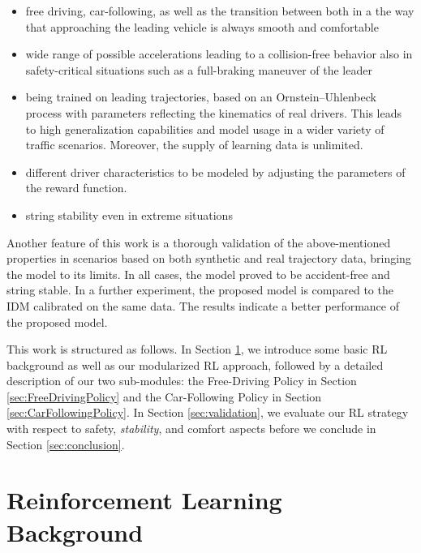 \documentclass[review]{elsarticle}
\providecommand{\martinc}[1]{}                  %
\providecommand{\3}{{\ss}}
\begin{document}
	
	\begin{itemize}
		\item free driving,
		car-following, as well as the transition between both in a
		the way that approaching the leading vehicle is always smooth and comfortable
		\item wide range of possible
		accelerations leading to a collision-free behavior
		also in safety-critical situations such as a full-braking maneuver of the leader
		\item being trained on leading trajectories,
		based on an Ornstein–Uhlenbeck process \citep{OU}
		with parameters reflecting the kinematics of real
		drivers. This leads to high generalization capabilities and
		model usage in a wider variety of traffic
		scenarios. Moreover, the supply of learning data is
		unlimited.
		\item different driver characteristics to be modeled by adjusting the parameters of the reward function.
		\item string stability even in extreme situations	
	\end{itemize}
	
	Another feature of this work is a thorough validation of the above-mentioned properties in scenarios based on both synthetic and real trajectory data, bringing the model to its limits. 
	In all cases, the model proved to be accident-free and string stable.
	In a further experiment, the proposed model is compared to the IDM calibrated on the same data. The results indicate a better performance of the proposed model.
	\martinc{Nach vorgestelltem Nebensatz oder Phrase (In Section ...,) folgt vor dem
		Hauptsatz (``we introduce...'') immer ein Komma}
	This work is structured as follows. In Section \ref{sec:RLBackground},
	we introduce some basic RL background as well as our modularized RL
	approach, followed by a detailed description of our two sub-modules:
	the Free-Driving Policy in Section \ref{sec:FreeDrivingPolicy} and the
	Car-Following Policy in Section
	\ref{sec:CarFollowingPolicy}. \martinc{In Englisch wird nach
		Doppelpunkt klein weitergeschrieben, wenn kein vollst\"andiger Satz
		folgt wie hier} In Section \ref{sec:validation}, we evaluate our RL
	strategy with respect to safety, \emph{stability}, and comfort aspects
	before we conclude in Section \ref{sec:conclusion}.
	
	
	\section{Reinforcement Learning Background}
	\label{sec:RLBackground}
	
\end{document}
